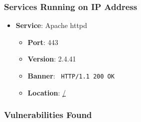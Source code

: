 \documentclass{article}
\begin{document}
\subsubsection*{Services Running on IP Address}

\begin{itemize}
    
        \item \textbf{Service}: Apache httpd
        \begin{itemize}
            \item \textbf{Port}: 443
            \item \textbf{Version}:  2.4.41 
            \item \textbf{Banner}: \texttt{
                HTTP/1.1 200 OK
            }
            \item \textbf{Location}: \href{ / }{ / }
        \end{itemize}
    
\end{itemize}


\subsubsection*{Vulnerabilities Found}
\end{document}
